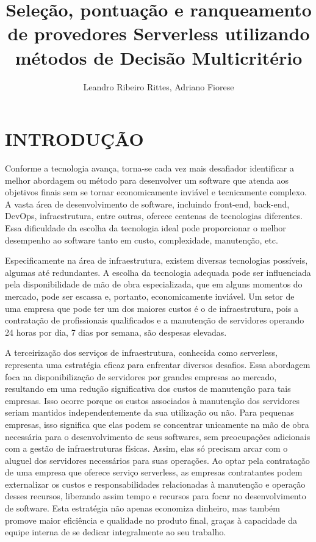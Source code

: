 \documentclass[12pt]{article}[abntex2]
\title{Seleção, pontuação e ranqueamento de provedores Serverless utilizando métodos de Decisão Multicritério}
\author{Leandro Ribeiro Rittes, Adriano Fiorese}
\begin{document}
\maketitle

\section{INTRODUÇÃO}
Conforme a tecnologia avança, torna-se cada vez mais desafiador identificar a melhor abordagem ou método para desenvolver um software que atenda aos objetivos finais sem se tornar economicamente inviável e tecnicamente complexo. A vasta área de desenvolvimento de software, incluindo front-end, back-end, DevOps, infraestrutura, entre outras, oferece centenas de tecnologias diferentes. Essa dificuldade da escolha da tecnologia ideal pode proporcionar o melhor desempenho ao software tanto em custo, complexidade, manutenção, etc.

Especificamente na área de infraestrutura, existem diversas tecnologias possíveis, algumas até redundantes. A escolha da tecnologia adequada pode ser influenciada pela disponibilidade de mão de obra especializada, que em alguns momentos do mercado, pode ser escassa e, portanto, economicamente inviável. Um setor de uma empresa que pode ter um dos maiores custos é o de infraestrutura, pois a contratação de profissionais qualificados e a manutenção de servidores operando 24 horas por dia, 7 dias por semana, são despesas elevadas. 

A terceirização dos serviços de infraestrutura, conhecida como serverless, representa uma estratégia eficaz para enfrentar diversos desafios. Essa abordagem foca na disponibilização de servidores por grandes empresas ao mercado, resultando em uma redução significativa dos custos de manutenção para tais empresas. Isso ocorre porque os custos associados à manutenção dos servidores seriam mantidos independentemente da sua utilização ou não. Para pequenas empresas, isso significa que elas podem se concentrar unicamente na mão de obra necessária para o desenvolvimento de seus softwares, sem preocupações adicionais com a gestão de infraestruturas físicas. Assim, elas só precisam arcar com o aluguel dos servidores necessários para suas operações. Ao optar pela contratação de uma empresa que oferece serviço serverless, as empresas contratantes podem externalizar os custos e responsabilidades relacionadas à manutenção e operação desses recursos, liberando assim tempo e recursos para focar no desenvolvimento de software. Esta estratégia não apenas economiza dinheiro, mas também promove maior eficiência e qualidade no produto final, graças à capacidade da equipe interna de se dedicar integralmente ao seu trabalho.
\end{document}
